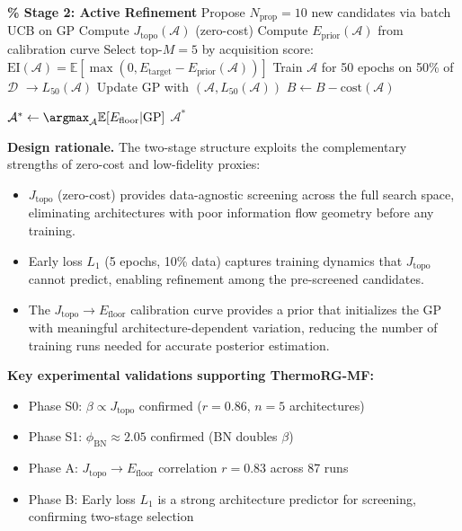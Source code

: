 \documentclass[11pt, a4paper]{article}
\theoremstyle{definition}
\begin{document}
\begin{algorithm}[htbp]
\begin{algorithmic}[1]
\STATE \textbf{\% Stage 2: Active Refinement}
    \STATE Propose $N_{\mathrm{prop}} = 10$ new candidates via batch UCB on GP
        \STATE Compute $J_{\mathrm{topo}}(\mathcal{A})$ (zero-cost)
        \STATE Compute $E_{\mathrm{prior}}(\mathcal{A})$ from calibration curve
    \ENDFOR
    \STATE Select top-$M = 5$ by acquisition score: $\mathrm{EI}(\mathcal{A}) = \mathbb{E}[\max(0, E_{\mathrm{target}} - E_{\mathrm{prior}}(\mathcal{A}))]$
        \STATE Train $\mathcal{A}$ for 50 epochs on 50\% of $\mathcal{D}$ $\rightarrow L_{50}(\mathcal{A})$
        \STATE Update GP with $(\mathcal{A}, L_{50}(\mathcal{A}))$
        \STATE $B \leftarrow B - \mathrm{cost}(\mathcal{A})$
    \ENDFOR
\ENDWHILE

\STATE $\mathcal{A}^* \leftarrow \argmax_{\mathcal{A}} \mathbb{E}[E_{\mathrm{floor}} | \mathrm{GP}]$
\RETURN $\mathcal{A}^*$
\end{algorithmic}
\end{algorithm}

\textbf{Design rationale.} The two-stage structure exploits the complementary strengths of zero-cost and low-fidelity proxies:
\begin{itemize}
    \item $J_{\mathrm{topo}}$ (zero-cost) provides data-agnostic screening across the full search space, eliminating architectures with poor information flow geometry before any training.
    \item Early loss $L_1$ (5 epochs, 10\% data) captures training dynamics that $J_{\mathrm{topo}}$ cannot predict, enabling refinement among the pre-screened candidates.
    \item The $J_{\mathrm{topo}} \to E_{\mathrm{floor}}$ calibration curve provides a prior that initializes the GP with meaningful architecture-dependent variation, reducing the number of training runs needed for accurate posterior estimation.
\end{itemize}

\textbf{Key experimental validations supporting ThermoRG-MF:}
\begin{itemize}
    \item Phase S0: $\beta \propto J_{\mathrm{topo}}$ confirmed ($r = 0.86$, $n=5$ architectures)
    \item Phase S1: $\phi_{\mathrm{BN}} \approx 2.05$ confirmed (BN doubles $\beta$)
    \item Phase A: $J_{\mathrm{topo}} \to E_{\mathrm{floor}}$ correlation $r = 0.83$ across 87 runs
    \item Phase B: Early loss $L_1$ is a strong architecture predictor for screening, confirming two-stage selection
\end{itemize}
\end{document}

